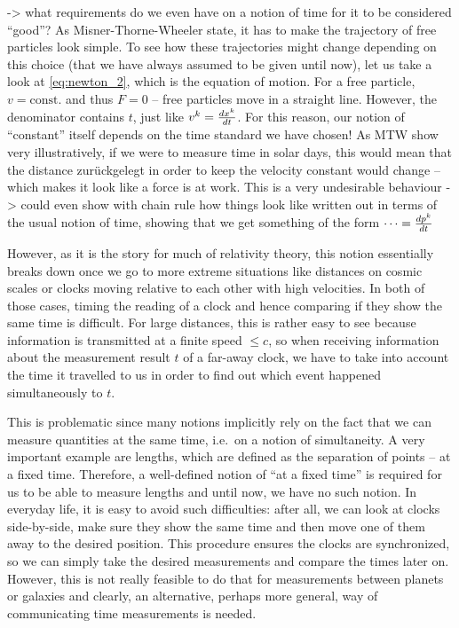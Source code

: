-> what requirements do we even have on a notion of time for it to be considered \enquote{good}? As Misner-Thorne-Wheeler state, it has to make the trajectory of free particles look simple. To see how these trajectories might change depending on this choice (that we have always assumed to be given until now), let us take a look at \eqref{eq:newton_2}, which is the equation of motion. For a free particle, $v = \text{const.}$ and thus $F = 0$ -- free particles move in a straight line. However, the denominator contains $t$, just like $v^k = \dv{x^k}{t}$. For this reason, our notion of \enquote{constant} itself depends on the time standard we have chosen! As MTW show very illustratively, if we were to measure time in solar days, this would mean that the distance zurückgelegt in order to keep the velocity constant would change -- which makes it look like a force is at work. This is a very undesirable behaviour -> could even show with chain rule how things look like written out in terms of the usual notion of time, showing that we get something of the form $\dots = \dv{p^k}{t}$


However, as it is the story for much of relativity theory, this notion essentially breaks down once we go to more extreme situations like distances on cosmic scales or clocks moving relative to each other with high velocities. In both of those cases, timing the reading of a clock and hence comparing if they show the same time is difficult. For large distances, this is rather easy to see because information is transmitted at a finite speed $\leq c$, so when receiving information about the measurement result $t$ of a far-away clock, we have to take into account the time it travelled to us in order to find out which event happened simultaneously to $t$.

This is problematic since many notions implicitly rely on the fact that we can measure quantities at the same time, i.e.~on a notion of simultaneity. A very important example are lengths, which are defined as the separation of points -- at a fixed time. Therefore, a well-defined notion of \enquote{at a fixed time} is required for us to be able to measure lengths and until now, we have no such notion. In everyday life, it is easy to avoid such difficulties: after all, we can look at clocks side-by-side, make sure they show the same time and then move one of them away to the desired position. This procedure ensures the clocks are synchronized, so we can simply take the desired measurements and compare the times later on. However, this is not really feasible to do that for measurements between planets or galaxies and clearly, an alternative, perhaps more general, way of communicating time measurements is needed.


